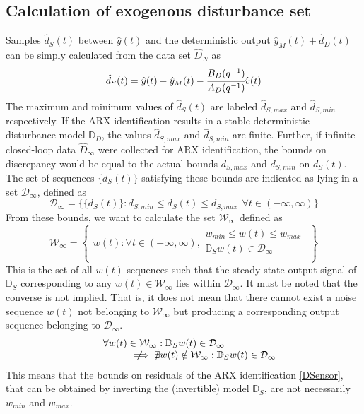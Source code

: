 \documentclass[letterpaper, 10 pt, conference]{ieeeconf}  %
\newcommand{\notimplies}{%
	\mathrel{{\ooalign{\hidewidth$\not\phantom{=}$\hidewidth\cr$\implies$}}}}
\begin{document}
	\subsection{Calculation of exogenous disturbance set}
	\label{Noise}
	Samples $\hat{d}_S(t)$ between $\hat{y}(t)$ and the deterministic output $\hat{y}_M(t)+\hat{d}_D(t)$ can be simply calculated from the data set $\hat{D}_{N}$ as 
	\begin{equation*}
	\hat{d}_S(t) = \hat{y}(t)-\hat{y}_M(t)-\cfrac{B_D(q^{-1})}{A_D(q^{-1})} \hat{v}(t) 
	\end{equation*}
	The maximum and minimum values of $\hat{d}_S(t)$ are labeled $\hat{d}_{S,max}$ and $\hat{d}_{S,min}$ respectively. If the ARX identification results in a stable deterministic disturbance model $\mathbb{D}_D$, the values $\hat{d}_{S,max}$ and $\hat{d}_{S,min}$ are finite. Further, if infinite closed-loop data $\hat{D}_{\infty}$ were collected for ARX identification, the bounds on discrepancy would be equal to the actual bounds $d_{S,max}$ and $d_{S,min}$ on $d_S(t)$. The set of sequences $\{d_S(t)\}$ satisfying these bounds are indicated as lying in a set $\mathcal{D}_{\infty}$, defined as 
	\begin{equation*}
	\mathcal{D}_{\infty} = \{\{d_S(t)\}: d_{S,min} \leq d_S(t) \leq d_{S,max} \hspace{5pt} \forall t \in (-\infty,\infty) \}
	\end{equation*}
	 From these bounds, we want to calculate the set $\mathcal{W}_{\infty}$ defined as
	\begin{equation*}
	\mathcal{W}_{\infty} = \begin{Bmatrix} w(t): \forall t \in (-\infty,\infty), \begin{matrix}
	w_{min}\leq w(t)\leq w_{max} \\ 
	\mathbb{D}_S w(t) \in \mathcal{D}_{\infty} \\
	\end{matrix} 
	\end{Bmatrix}
	\end{equation*}  
	This is the set of all $w(t)$ sequences such that the steady-state output signal of $\mathbb{D}_S$ corresponding to any $w(t)\in \mathcal{W}_{\infty}$  lies within $\mathcal{D}_{\infty}$. It must be noted that the converse is not implied. That is, it does not mean that there cannot exist a noise sequence $w(t)$ not belonging to $\mathcal{W}_{\infty}$ but producing a corresponding output sequence belonging to $\mathcal{D}_{\infty}$.
	\begin{equation*}
	\begin{matrix}
	\hspace{-40pt}\forall w(t) \in \mathcal{W}_{\infty}  : \mathbb{D}_S w(t) \in \mathcal{D}_{\infty} \\
	\hspace{40pt}\notimplies \nexists  w(t) \notin \mathcal{W}_{\infty} : \mathbb{D}_S w(t) \in \mathcal{D}_{\infty}
	\end{matrix}
	\end{equation*}
	This means that the bounds on residuals of the ARX identification \eqref{DSensor}, that can be obtained by inverting the (invertible) model $\mathbb{D}_S$, are not necessarily $w_{min}$ and $w_{max}$. 
		
\end{document}
